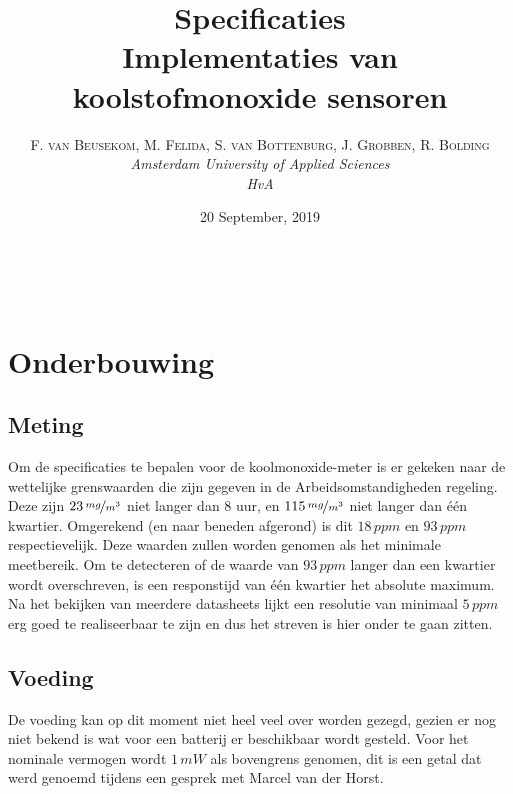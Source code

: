 \documentclass[a4paper, 11pt]{article} %
\title{\textbf{Specificaties}\\ %
Implementaties van koolstofmonoxide sensoren} %
\author{\textsc{F. van Beusekom, M. Felida, S. van Bottenburg, J. Grobben, R. Bolding} %
\\{\textit{Amsterdam University of Applied Sciences\\ 
HvA}}} %
\date{20 September, 2019} %
\makeatletter
\renewcommand{\maketitle}{ %
\begin{flushright} %
{\LARGE\@title} %

\vspace{50pt} %

{\large\@author} %
\\\@date %

\vspace{40pt} %
\end{flushright}
}
\makeatother
\begin{document}
\captionsetup{justification=centering}
\hypersetup{hidelinks=true}
\maketitle %




\vspace{10pt} %

\newpage
\section{Onderbouwing}
\subsection{Meting}
Om de specificaties te bepalen voor de koolmonoxide-meter is er gekeken naar de wettelijke grenswaarden die zijn gegeven in de Arbeidsomstandigheden regeling. Deze zijn $23\,\nicefrac{mg}{m^{3}}$ niet langer dan 8 uur, en $115\,\nicefrac{mg}{m^{3}}$ niet langer dan één kwartier. Omgerekend (en naar beneden afgerond) is dit $18\,ppm$ en $93\,ppm$ respectievelijk. Deze waarden zullen worden genomen als het minimale meetbereik. Om te detecteren of de waarde van $93\,ppm$ langer dan een kwartier wordt overschreven, is een responstijd van één kwartier het absolute maximum. Na het bekijken van meerdere datasheets lijkt een resolutie van minimaal $5\,ppm$ erg goed te realiseerbaar te zijn en dus het streven is hier onder te gaan zitten.
\subsection{Voeding}
De voeding kan op dit moment niet heel veel over worden gezegd, gezien er nog niet bekend is wat voor een batterij er beschikbaar wordt gesteld. Voor het nominale vermogen wordt $1\,mW$ als bovengrens genomen, dit is een getal dat werd genoemd tijdens een gesprek met Marcel van der Horst.
\end{document}
